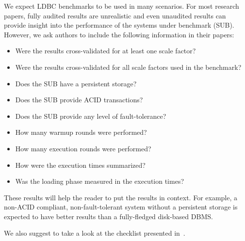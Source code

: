 We expect LDBC benchmarks to be used in many scenarios.
For most research papers, fully audited results are unrealistic and even unaudited results can provide insight into the performance of the systems under benchmark (SUB). However, we ask authors to include the following information in their papers:

\begin{itemize}
\item Were the results cross-validated for at least one scale factor?
\item Were the results cross-validated for all scale factors used in the benchmark?
\item Does the SUB have a persistent storage?
\item Does the SUB provide ACID transactions?
\item Does the SUB provide any level of fault-tolerance?
\item How many warmup rounds were performed?
\item How many execution rounds were performed?
\item How were the execution times summarized? %
\item Was the loading phase measured in the execution times?  
\end{itemize}

These results will help the reader to put the results in context. For example, a non-ACID compliant, non-fault-tolerant system without a persistent storage is expected to have better results than a fully-fledged disk-based DBMS.

We also suggest to take a look at the checklist presented in~\cite{DBLP:conf/sigmod/RaasveldtHGM18}.